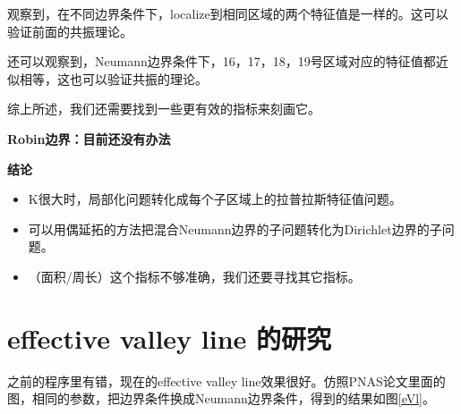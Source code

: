 \documentclass[12pt,a4paper]{article}
\begin{document}
观察到，在不同边界条件下，localize到相同区域的两个特征值是一样的。这可以验证前面的共振理论。

还可以观察到，Neumann边界条件下，16，17，18，19号区域对应的特征值都近似相等，这也可以验证共振的理论。

综上所述，我们还需要找到一些更有效的指标来刻画它。

\textbf{Robin边界：目前还没有办法}

\textbf{结论}
\begin{itemize}
\item K很大时，局部化问题转化成每个子区域上的拉普拉斯特征值问题。
\item 可以用偶延拓的方法把混合Neumann边界的子问题转化为Dirichlet边界的子问题。
\item （面积/周长）这个指标不够准确，我们还要寻找其它指标。
\end{itemize}

\section{effective valley line 的研究}

之前的程序里有错，现在的effective valley line效果很好。仿照PNAS论文里面的图，相同的参数，把边界条件换成Neumann边界条件，得到的结果如图\ref{eVl}。
\end{document}
